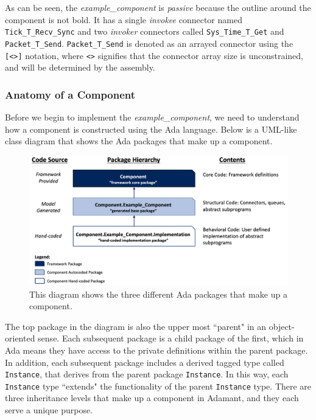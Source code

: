 As can be seen, the \textit{example\_component} is \textit{passive} because the outline around the component is not bold. It has a single \textit{invokee} connector named \texttt{Tick\_T\_Recv\_Sync} and two \textit{invoker} connectors called \texttt{Sys\_Time\_T\_Get} and \texttt{Packet\_T\_Send}. \texttt{Packet\_T\_Send} is denoted as an arrayed connector using the \texttt{[<>]} notation, where \texttt{<>} signifies that the connector array size is unconstrained, and will be determined by the assembly.

\subsubsection{Anatomy of a Component} \label{Anatomy of a Component}

Before we begin to implement the \textit{example\_component}, we need to understand how a component is constructed using the Ada language. Below is a UML-like class diagram that shows the Ada packages that make up a component.

\vspace{5mm} %
\begin{figure}[H]
  \includegraphics[width=1.00\textwidth,center]{images/componentpackages.png}
  \caption{This diagram shows the three different Ada packages that make up a component.}\label{Component Package Diagram}
\end{figure}
\vspace{5mm} %

The top package in the diagram is also the upper most ``parent" in an object-oriented sense. Each subsequent package is a child package of the first, which in Ada means they have access to the private definitions within the parent package. In addition, each subsequent package includes a derived tagged type called \texttt{Instance}, that derives from the parent package \texttt{Instance}. In this way, each \texttt{Instance} type ``extends" the functionality of the parent \texttt{Instance} type. There are three inheritance levels that make up a component in Adamant, and they each serve a unique purpose. \\

